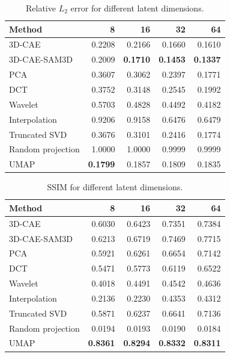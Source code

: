 \documentclass[pdflatex,sn-mathphys-num]{sn-jnl}%
\theoremstyle{thmstyleone}%
\theoremstyle{thmstyletwo}%
\theoremstyle{thmstylethree}%
\begin{document}
\begin{table}[htbp]
\caption{Relative $L_2$ error for different latent dimensions.}
\label{tab:l2_by_components}
\centering
\begin{tabular}{lrrrr}
\toprule
Method & 8 & 16 & 32 & 64 \\
\midrule
3D-CAE & 0.2208 & 0.2166 & 0.1660 & 0.1610 \\
3D-CAE-SAM3D & 0.2009 & \textbf{0.1710} & \textbf{0.1453} & \textbf{0.1337} \\
PCA & 0.3607 & 0.3062 & 0.2397 & 0.1771 \\
DCT & 0.3752 & 0.3148 & 0.2545 & 0.1992 \\
Wavelet & 0.5703 & 0.4828 & 0.4492 & 0.4182 \\
Interpolation & 0.9206 & 0.9158 & 0.6476 & 0.6479 \\
Truncated SVD & 0.3676 & 0.3101 & 0.2416 & 0.1774 \\
Random projection & 1.0000 & 1.0000 & 0.9999 & 0.9999 \\
UMAP & \textbf{0.1799} & 0.1857 & 0.1809 & 0.1835 \\
\bottomrule
\end{tabular}
\end{table}

\begin{table}[htbp]
\caption{SSIM for different latent dimensions.}
\label{tab:ssim_by_components}
\centering
\begin{tabular}{lrrrr}
\toprule
Method & 8 & 16 & 32 & 64 \\
\midrule
3D-CAE & 0.6030 & 0.6423 & 0.7351 & 0.7384 \\
3D-CAE-SAM3D & 0.6213 & 0.6719 & 0.7469 & 0.7715 \\
PCA & 0.5921 & 0.6261 & 0.6654 & 0.7142 \\
DCT & 0.5471 & 0.5773 & 0.6119 & 0.6522 \\
Wavelet & 0.4018 & 0.4491 & 0.4542 & 0.4636 \\
Interpolation & 0.2136 & 0.2230 & 0.4353 & 0.4312 \\
Truncated SVD & 0.5871 & 0.6237 & 0.6641 & 0.7136 \\
Random projection & 0.0194 & 0.0193 & 0.0190 & 0.0184 \\
UMAP & \textbf{0.8361} & \textbf{0.8294} & \textbf{0.8332} & \textbf{0.8311} \\
\bottomrule
\end{tabular}
\end{table}
\end{document}
